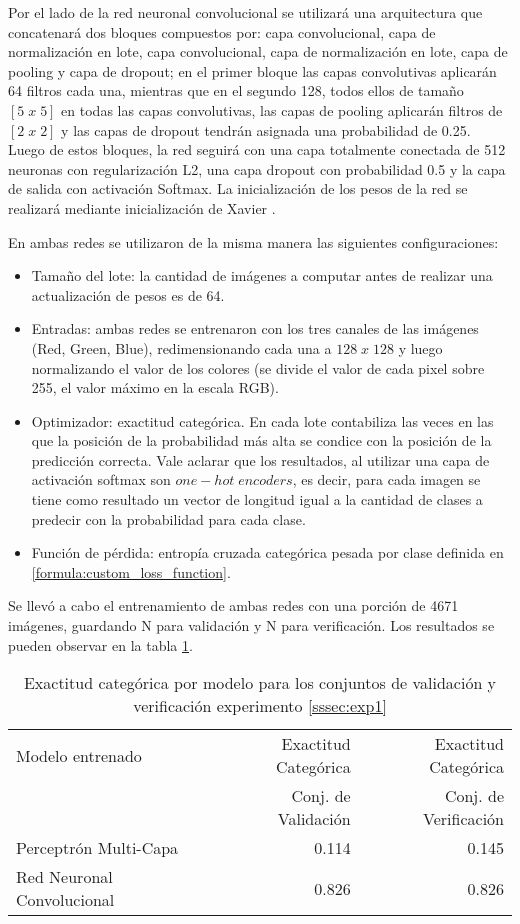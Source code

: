 Por el lado de la red neuronal convolucional se utilizará una arquitectura que concatenará dos bloques compuestos por: capa convolucional, capa de normalización en lote, capa convolucional, capa de normalización en lote, capa de pooling y capa de dropout; en el primer bloque las capas convolutivas aplicarán 64 filtros cada una, mientras que en el segundo 128, todos ellos de tamaño \([5\;x\;5]\) en todas las capas convolutivas, las capas de pooling aplicarán filtros de \([2\;x\;2]\) y las capas de dropout tendrán asignada una probabilidad de 0.25. Luego de estos bloques, la red seguirá con una capa totalmente conectada de 512 neuronas con regularización L2, una capa dropout con probabilidad 0.5 y la capa de salida con activación Softmax. La inicialización de los pesos de la red se realizará mediante inicialización de Xavier \cite{glorot2010understanding}. 

En ambas redes se utilizaron de la misma manera las siguientes configuraciones: 
\begin{itemize}
	\item Tamaño del lote: la cantidad de imágenes a computar antes de realizar una actualización de pesos es de 64.
	\item Entradas: ambas redes se entrenaron con los tres canales de las imágenes (Red, Green, Blue), redimensionando cada una a \(128\; x\; 128\) y luego normalizando el valor de los colores (se divide el valor de cada pixel sobre 255, el valor máximo en la escala RGB).
	\item Optimizador: exactitud categórica. En cada lote contabiliza las veces en las que la posición de la probabilidad más alta se condice con la posición de la predicción correcta. Vale aclarar que los resultados, al utilizar una capa de activación softmax son \(one-hot\; encoders\), es decir, para cada imagen se tiene como resultado un vector de longitud igual a la cantidad de clases a predecir con la probabilidad para cada clase. 
	\item Función de pérdida: entropía cruzada categórica pesada por clase definida en  \ref{formula:custom_loss_function}.
\end{itemize}

Se llevó a cabo el entrenamiento de ambas redes con una porción de 4671 imágenes, guardando N para validación y N para verificación. Los resultados se pueden observar en la tabla \ref{exp1:results}.

\begin{table}[h!]
	\centering
	\begin{tabular}{| l | r | r |}
		\toprule
		Modelo entrenado & Exactitud Categórica &  Exactitud Categórica \\
		{} & Conj. de Validación &  Conj. de Verificación \\
		\midrule
		Perceptrón Multi-Capa & 0.114 & 0.145 \\
		Red Neuronal Convolucional & 0.826 & 0.826\\
		\bottomrule
	\end{tabular}
	\caption{Exactitud categórica por modelo para los conjuntos de validación y verificación experimento \ref{sssec:exp1}}
	\label{exp1:results}
\end{table}


